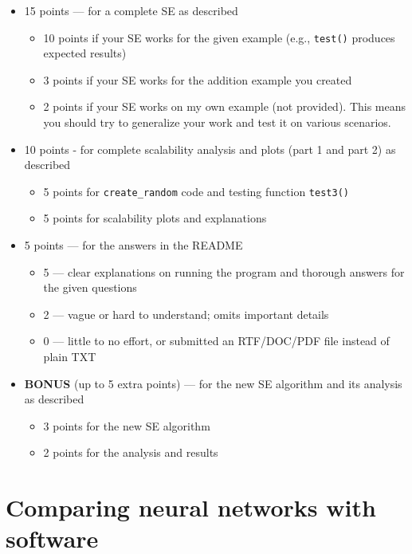 \documentclass[oneside,11pt,dvipsnames]{book}
\numberwithin{equation}{section}
\theoremstyle{definition}
\theoremstyle{remark}
\begin{document}
\begin{itemize}
\item 15 points — for a complete SE as described
    \begin{itemize}
    \item 10 points if your SE works for the given example (e.g., \texttt{test()} produces expected results)
    \item 3 points if your SE works for the addition example you created
    \item 2 points if your SE works on my own example (not provided). This means you should try to generalize your work and test it on various scenarios.
    \end{itemize}
\item 10 points - for complete scalability analysis and plots (part 1 and part 2) as described
  \begin{itemize} 
    \item 5 points for \texttt{create\_random} code and testing function \texttt{test3()}
    \item 5 points for scalability plots and explanations    
  \end{itemize}
\item 5 points — for the answers in the README
    \begin{itemize}
    \item 5 — clear explanations on running the program and thorough answers for the given questions
    \item 2 — vague or hard to understand; omits important details
    \item 0 — little to no effort, or submitted an RTF/DOC/PDF file instead of plain TXT
    \end{itemize}
\item \textbf{BONUS} (up to 5 extra points) — for the new SE algorithm and its analysis as described
    \begin{itemize}
    \item 3 points for the new SE algorithm
    \item 2 points for the analysis and results
    \end{itemize}
\end{itemize}

\renewcommand{\appendixname}{Background}
\appendix

\chapter{Comparing neural networks with software}\label{app:nn-vs-software}
\end{document}

